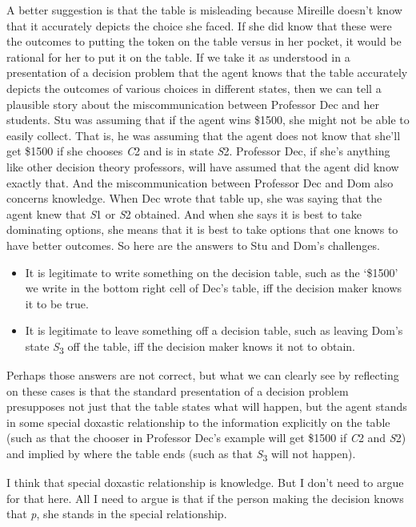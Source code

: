 \documentclass[
  11pt,
]{book}
\providecommand{\tightlist}{%
  \setlength{\itemsep}{0pt}\setlength{\parskip}{0pt}}
\begin{document}
A better suggestion is that the table is misleading because Mireille doesn't know that it accurately depicts the choice she faced. If she did know that these were the outcomes to putting the token on the table versus in her pocket, it would be rational for her to put it on the table. If we take it as understood in a presentation of a decision problem that the agent knows that the table accurately depicts the outcomes of various choices in different states, then we can tell a plausible story about the miscommunication between Professor Dec and her students. Stu was assuming that if the agent wins \$1500, she might not be able to easily collect. That is, he was assuming that the agent does not know that she'll get \$1500 if she chooses \emph{C}2 and is in state \emph{S}2. Professor Dec, if she's anything like other decision theory professors, will have assumed that the agent did know exactly that. And the miscommunication between Professor Dec and Dom also concerns knowledge. When Dec wrote that table up, she was saying that the agent knew that \emph{S}1 or \emph{S}2 obtained. And when she says it is best to take dominating options, she means that it is best to take options that one knows to have better outcomes. So here are the answers to Stu and Dom's challenges.

\begin{itemize}
\tightlist
\item
  It is legitimate to write something on the decision table, such as the `\$1500' we write in the bottom right cell of Dec's table, iff the decision maker knows it to be true.
\item
  It is legitimate to leave something off a decision table, such as leaving Dom's state \emph{S}\textsubscript{3} off the table, iff the decision maker knows it not to obtain.
\end{itemize}

Perhaps those answers are not correct, but what we can clearly see by reflecting on these cases is that the standard presentation of a decision problem presupposes not just that the table states what will happen, but the agent stands in some special doxastic relationship to the information explicitly on the table (such as that the chooser in Professor Dec's example will get \$1500 if \emph{C}2 and \emph{S}2) and implied by where the table ends (such as that \emph{S}\textsubscript{3} will not happen).

I think that special doxastic relationship is knowledge. But I don't need to argue for that here. All I need to argue is that if the person making the decision knows that \emph{p}, she stands in the special relationship.
\end{document}
